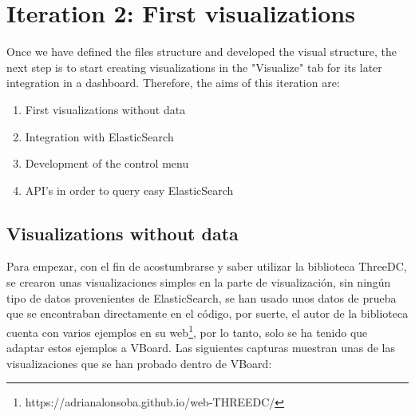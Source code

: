 \documentclass[a4paper, 12pt]{book}
\begin{document}
\section{Iteration 2: First visualizations}

Once we have defined the files structure and developed the visual structure, the next step is to start creating visualizations in the "Visualize" tab for its later integration in a dashboard. Therefore, the aims of this iteration are:

\begin{enumerate}
\item First visualizations without data
\item Integration with ElasticSearch
\item Development of the control menu
\item API's in order to query easy ElasticSearch
\end{enumerate}

\subsection{Visualizations without data}

Para empezar, con el fin de acostumbrarse y saber utilizar la biblioteca ThreeDC, se crearon unas visualizaciones simples en la parte de visualización, sin ningún tipo de datos provenientes de ElasticSearch, se han usado unos datos de prueba que se encontraban directamente en el código, por suerte, el autor de la biblioteca cuenta con varios ejemplos en su web\footnote{https://adrianalonsoba.github.io/web-THREEDC/}, por lo tanto, solo se ha tenido que adaptar estos ejemplos a VBoard. Las siguientes capturas muestran unas de las visualizaciones que se han probado dentro de VBoard:
\end{document}
